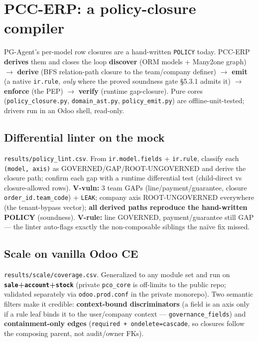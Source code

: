 \documentclass[runningheads]{llncs}
\newcommand{\code}[1]{\texttt{#1}}
\begin{document}
\section{PCC-ERP: a policy-closure compiler}
PG-Agent's per-model row closures are a hand-written \code{POLICY} today. PCC-ERP \textbf{derives} them and closes
the loop \textbf{discover} (ORM models + Many2one graph) $\to$ \textbf{derive} (BFS relation-path closure to the
team/company definer) $\to$ \textbf{emit} (a native \code{ir.rule}, \emph{only} where the proved soundness gate
\S5.3.1 admits it) $\to$ \textbf{enforce} (the PEP) $\to$ \textbf{verify} (runtime gap-closure). Pure cores
(\code{policy_closure.py}, \code{domain_ast.py}, \code{policy_emit.py}) are offline-unit-tested; drivers run in an
Odoo shell, read-only.

\subsection{Differential linter on the mock}
\code{results/policy_lint.csv}. From \code{ir.model.fields} + \code{ir.rule}, classify each
\code{(model, axis)} as GOVERNED/GAP/ROOT-UNGOVERNED and derive the closure path; confirm each gap with a
runtime differential test (child-direct vs closure-allowed rows). \textbf{V-vuln:} 3 team GAPs
(line/payment/guarantee, closure \code{order_id.team_code}) + \code{LEAK}; company axis ROOT-UNGOVERNED
everywhere (the tenant-bypass vector); \textbf{all derived paths reproduce the hand-written POLICY}
(soundness). \textbf{V-rule:} line GOVERNED, payment/guarantee still GAP --- the linter auto-flags exactly the
non-composable siblings the na\"ive fix missed.

\subsection{Scale on vanilla Odoo CE}
\code{results/scale/coverage.csv}. Generalized to any module set and run on
\textbf{\code{sale}+\code{account}+\code{stock}} (private \code{pco_core} is off-limits to the public repo;
validated separately via \code{odoo.prod.conf} in the private monorepo). Two semantic filters make it credible:
\textbf{context-bound discriminators} (a field is an axis only if a rule leaf binds it to the user/company
context --- \code{governance_fields}) and \textbf{containment-only edges} (\code{required + ondelete=cascade},
so closures follow the composing parent, not audit/owner FKs).
\end{document}
